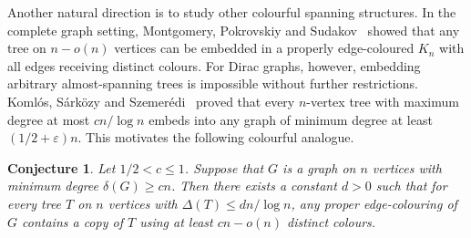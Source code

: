 \documentclass[11pt,reqno]{amsart}
\newtheorem{conjecture}[theorem]{Conjecture}
\theoremstyle{definition}
\theoremstyle{remark}
\renewcommand\le{\leqslant}
\renewcommand\ge{\geqslant}
\begin{document}
Another natural direction is to study other colourful spanning structures.
In the complete graph setting, Montgomery, Pokrovskiy and Sudakov~\cite{MPS} showed that any tree on $n-o(n)$ vertices can be embedded in a properly edge-coloured $K_n$ with all edges receiving distinct colours.
For Dirac graphs, however, embedding arbitrary almost-spanning trees is impossible without further restrictions.
Koml\'os, S\'ark\"ozy and Szemer\'edi~\cite{KSS} proved that every $n$-vertex tree with maximum degree at most $cn/\log n$ embeds into any graph of minimum degree at least $(1/2+\varepsilon)n$.
This motivates the following colourful analogue.


\begin{conjecture}
Let $1/2<c\le1$. Suppose that $G$ is a graph on $n$ vertices with minimum degree
$\delta(G)\ge cn$. Then there exists a constant $d>0$ such that for every tree $T$ on $n$ vertices with $\Delta(T)\le dn/\log n$, any proper edge-colouring of $G$
contains a copy of $T$ using at least $cn-o(n)$ distinct colours.
\end{conjecture}



\medskip
\end{document}
